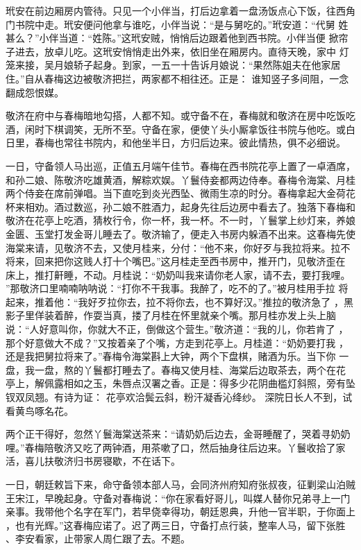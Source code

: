 玳安在前边厢房内管待。只见一个小伴当，打后边拿着一盘汤饭点心下饭，往西角
门书院中走。玳安便问他拿与谁吃，小伴当说：“是与舅吃的。”玳安道：“代舅
姓甚么？”小伴当道：“姓陈。”这玳安贼，悄悄后边跟着他到西书院。小伴当便
掀帘子进去，放卓儿吃。这玳安悄悄走出外来，依旧坐在厢房内。直待天晚，家中
灯笼来接，吴月娘轿子起身。到家，一五一十告诉月娘说：“果然陈姐夫在他家居
住。”自从春梅这边被敬济把拦，两家都不相往还。正是：
谁知竖子多间阻，一念翻成怨恨媒。

敬济在府中与春梅暗地勾搭，人都不知。或守备不在，春梅就和敬济在房中吃饭吃
酒，闲时下棋调笑，无所不至。守备在家，便使丫头小厮拿饭往书院与他吃。或白
日里，春梅也常往书院内，和他坐半日，方归后边来。彼此情热，俱不必细说。

一日，守备领人马出巡，正值五月端午佳节。春梅在西书院花亭上置了一卓酒席，
和孙二娘、陈敬济吃雄黄酒，解粽欢娱。丫鬟侍妾都两边侍奉。春梅令海棠、月桂
两个侍妾在席前弹唱。当下直吃到炎光西坠、微雨生凉的时分。春梅拿起大金荷花
杯来相劝。酒过数巡，孙二娘不胜酒力，起身先往后边房中看去了。独落下春梅和
敬济在花亭上吃酒，猜枚行令，你一杯，我一杯。不一时，丫鬟掌上纱灯来，养娘
金匮、玉堂打发金哥儿睡去了。敬济输了，便走入书房内躲酒不出来。这春梅先使
海棠来请，见敬济不去，又使月桂来，分付：“他不来，你好歹与我拉将来。拉不
将来，回来把你这贱人打十个嘴巴。”这月桂走至西书房中，推开门，见敬济歪在
床上，推打鼾睡，不动。月桂说：“奶奶叫我来请你老人家，请不去，要打我哩。
”那敬济口里喃喃呐呐说：“打你不干我事。我醉了，吃不的了。”被月桂用手拉
将起来，推着他：“我好歹拉你去，拉不将你去，也不算好汉。”推拉的敬济急了
，黑影子里佯装着醉，作耍当真，搂了月桂在怀里就亲个嘴。那月桂亦发上头上脑
说：“人好意叫你，你就大不正，倒做这个营生。”敬济道：“我的儿，你若肯了
，那个好意做大不成？”又按着亲了个嘴，方走到花亭上。月桂道：“奶奶要打我
，还是我把舅拉将来了。”春梅令海棠斟上大钟，两个下盘棋，赌酒为乐。当下你
一盘，我一盘，熬的丫鬟都打睡去了。春梅又使月桂、海棠后边取茶去，两个在花
亭上，解佩露相如之玉，朱唇点汉署之香。正是：得多少花阴曲槛灯斜照，旁有坠
钗双凤翘。有诗为证：
花亭欢洽鬓云斜，粉汗凝香沁绛纱。
深院日长人不到，试看黄鸟啄名花。

两个正干得好，忽然丫鬟海棠送茶来：“请奶奶后边去，金哥睡醒了，哭着寻奶奶
哩。”春梅陪敬济又吃了两钟酒，用茶嗽了口，然后抽身往后边来。丫鬟收拾了家
活，喜儿扶敬济归书房寝歇，不在话下。

一日，朝廷敕旨下来，命守备领本部人马，会同济州府知府张叔夜，征剿梁山泊贼
王宋江，早晚起身。守备对春梅说：“你在家看好哥儿，叫媒人替你兄弟寻上一门
亲事。我带他个名字在军门，若早侥幸得功，朝廷恩典，升他一官半职，于你面上
，也有光辉。”这春梅应诺了。迟了两三日，守备打点行装，整率人马，留下张胜
、李安看家，止带家人周仁跟了去。不题。

